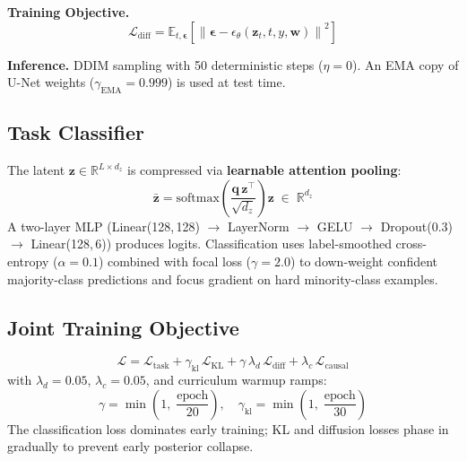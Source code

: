 \documentclass[conference]{IEEEtran}
\begin{document}
\textbf{Training Objective.}
\begin{equation}
    \mathcal{L}_{\mathrm{diff}} = \mathbb{E}_{t,\boldsymbol{\epsilon}}
    \!\left[\left\|\boldsymbol{\epsilon} -
    \epsilon_\theta(\mathbf{z}_t, t, y, \mathbf{w})\right\|^2\right]
\end{equation}

\textbf{Inference.}
DDIM sampling \cite{song2021ddim} with 50 deterministic steps ($\eta=0$).
An EMA copy of U-Net weights ($\gamma_{\mathrm{EMA}}=0.999$) is used at
test time.

\subsection{Task Classifier}

The latent $\mathbf{z} \in \mathbb{R}^{L \times d_z}$ is compressed via
\textbf{learnable attention pooling}:
\begin{equation}
    \bar{\mathbf{z}} = \mathrm{softmax}\!\left(\frac{\mathbf{q}\,\mathbf{z}^\top}{\sqrt{d_z}}\right)\mathbf{z}
    \;\in\; \mathbb{R}^{d_z}
\end{equation}
A two-layer MLP (Linear(128,\,128) $\to$ LayerNorm $\to$ GELU $\to$
Dropout(0.3) $\to$ Linear(128,\,6)) produces logits.  Classification uses
label-smoothed cross-entropy ($\alpha=0.1$) combined with focal loss
($\gamma=2.0$) \cite{lin2017focal} to down-weight confident majority-class
predictions and focus gradient on hard minority-class examples.

\subsection{Joint Training Objective}
\label{sec:joint_loss}

\begin{equation}
    \mathcal{L} = \mathcal{L}_{\mathrm{task}} + \gamma_{\mathrm{kl}}\,\mathcal{L}_{\mathrm{KL}}
    + \gamma\,\lambda_d\,\mathcal{L}_{\mathrm{diff}}
    + \lambda_c\,\mathcal{L}_{\mathrm{causal}}
\end{equation}
with $\lambda_d = 0.05$, $\lambda_c = 0.05$, and curriculum warmup ramps:
\begin{equation}
    \gamma = \min\!\left(1,\;\frac{\mathrm{epoch}}{20}\right), \quad
    \gamma_{\mathrm{kl}} = \min\!\left(1,\;\frac{\mathrm{epoch}}{30}\right)
\end{equation}
The classification loss dominates early training; KL and diffusion losses
phase in gradually to prevent early posterior collapse.
\end{document}
